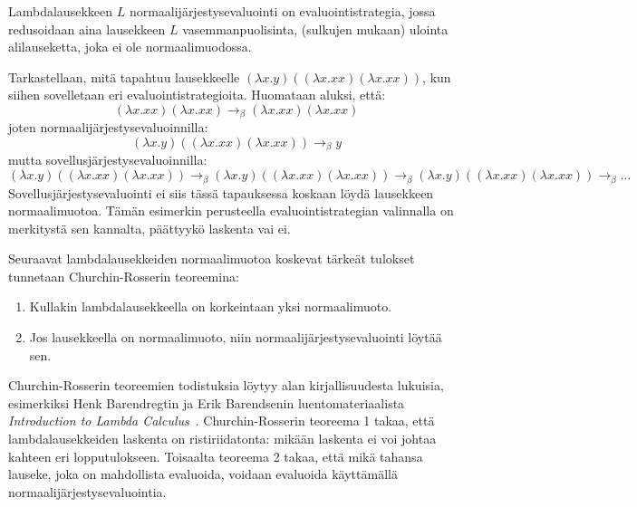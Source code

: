 \begin{alg}[normaalijärjestysevaluointi]
Lambdalausekkeen $L$ normaalijärjestysevaluointi on evaluointistrategia, jossa redusoidaan aina lausekkeen $L$ vasemmanpuolisinta, (sulkujen mukaan) ulointa alilauseketta, joka ei ole normaalimuodossa.
\end{alg}

\begin{esim}
Tarkastellaan, mitä tapahtuu lausekkeelle $(\lambda x . y) ((\lambda x . xx) (\lambda x . xx))$, kun siihen sovelletaan eri evaluointistrategioita. Huomataan aluksi, että:  
\[ (\lambda x . xx) (\lambda x . xx) \rightarrow_{\beta} (\lambda x . xx) (\lambda x . xx) \]
joten normaalijärjestysevaluoinnilla:
\[ (\lambda x . y) ((\lambda x . xx) (\lambda x . xx)) \rightarrow_{\beta} y \]
mutta sovellusjärjestysevaluoinnilla:
\[  (\lambda x . y) ((\lambda x . xx) (\lambda x . xx)) \rightarrow_{\beta}
	(\lambda x . y) ((\lambda x . xx) (\lambda x . xx)) \rightarrow_{\beta}
	(\lambda x . y) ((\lambda x . xx) (\lambda x . xx)) \rightarrow_{\beta} \ldots \]
Sovellusjärjestysevaluointi ei siis tässä tapauksessa koskaan löydä lausekkeen normaalimuotoa. Tämän esimerkin perusteella evaluointistrategian valinnalla on merkitystä sen kannalta, päättyykö laskenta vai ei. 
\end{esim}
\par
Seuraavat lambdalausekkeiden normaalimuotoa koskevat tärkeät tulokset tunnetaan Churchin-Rosserin teoreemina: 
\begin{lau}
\begin{enumerate} $ $ %
	\item Kullakin lambdalausekkeella on korkeintaan yksi normaalimuoto.
	\item Jos lausekkeella on normaalimuoto, niin normaalijärjestysevaluointi löytää sen. 
\end{enumerate}
\end{lau}
\par
Churchin-Rosserin teoreemien todistuksia löytyy alan kirjallisuudesta lukuisia, esimerkiksi Henk Barendregtin ja Erik Barendsenin luentomateriaalista \textit{Introduction to Lambda Calculus}~\cite[s.~23--30]{HBEB2000}. Churchin-Rosserin teoreema 1 takaa, että lambdalausekkeiden laskenta on ristiriidatonta: mikään laskenta ei voi johtaa kahteen eri lopputulokseen. Toisaalta teoreema 2 takaa, että mikä tahansa lauseke, joka on mahdollista evaluoida, voidaan evaluoida käyttämällä normaalijärjestysevaluointia.
